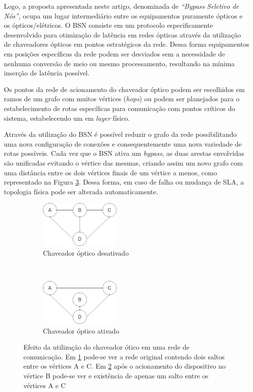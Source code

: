 Logo, a proposta apresentada neste artigo, denominada de  \emph{``Bypass Seletivo de Nós''}, ocupa um lugar intermediário entre os equipamentos puramente ópticos e os ópticos/elétricos. O BSN consiste em um protocolo especificamente desenvolvido para otimização de latência em redes ópticas através da utilização de chaveadores ópticos em pontos estratégicos da rede. Dessa forma equipamentos em posições específicas da rede podem ser desviados sem a necessidade de nenhuma conversão de meio ou mesmo processamento, resultando na mínima inserção de latência possível. 

Os pontos da rede de acionamento do chaveador óptico podem ser escolhidos em ramos de um grafo com muitos vértices (\emph{hops}) ou podem ser planejados para o estabelecimento de rotas específicas para comunicação com pontos críticos do sistema, estabelecendo um  em \emph{layer} físico.

Através da utilização do BSN é possível reduzir o grafo da rede possibilitando uma nova configuração de conexões e consequentemente uma nova variedade de rotas possíveis. Cada vez que o BSN ativa um \emph{bypass}, as duas arestas envolvidas são unificadas evitando o vértice das mesmas, criando assim um novo grafo com uma distância entre os dois vértices finais de um vértice a menos, como representado na Figura \ref{fig-bypass-exemplo}. Dessa forma, em caso de falha ou mudança de SLA, a topologia física pode ser alterada automaticamente.

\begin{figure}[t!]
	\centering
	\begin{subfigure}[t]{0.4\textwidth}
		\centering
		\includegraphics[width=4cm]{./figuras/Bypass-exemplo-A.png} %
		\caption{Chaveador óptico desativado}
		\label{fig_bypass_exemplo_A}
	\end{subfigure}%
	~
	\begin{subfigure}[t]{0.4\textwidth}
		\centering
		\includegraphics[width=4cm]{./figuras/Bypass-exemplo-B.png} %
	\caption{Chaveador óptico ativado}
	\label{fig_bypass_exemplo_B}
	\end{subfigure}
	\caption[Exemplo de atuação de \emph{by-pass} óptico]{Efeito da utilização do chaveador ótico em uma rede de comunicação. Em \ref{fig_bypass_exemplo_A} pode-se ver a rede original contendo dois saltos entre os vértices A e C. Em \ref{fig_bypass_exemplo_B} após o acionamento do dispositivo no vértice B pode-se ver e existência de apenas um salto entre os vértices A e C}
	\label{fig-bypass-exemplo}
\end{figure}

